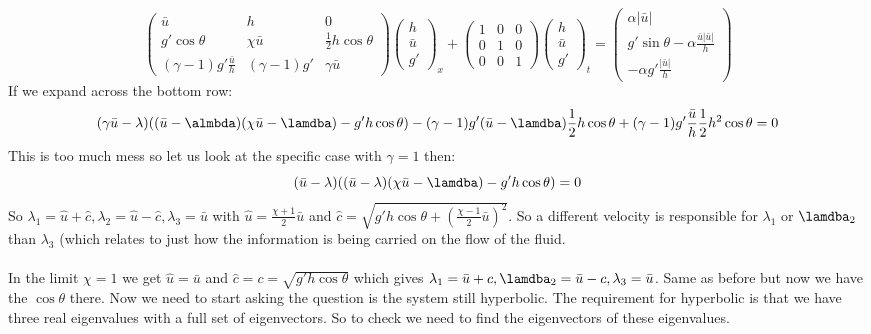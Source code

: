 \documentclass{article}
\begin{document}
$$
 \begin{pmatrix} \bar u & h & 0 \\ g' \cos \theta & \chi \bar u & \frac{1}{2} h \cos \theta \\ ( \gamma -1) g' \frac{\bar u}{h} & ( \gamma -1) g' & \gamma \bar u \end{pmatrix} \begin{pmatrix} h \\ \bar u \\ g' \end{pmatrix}_x + \begin{pmatrix} 1 & 0 & 0 \\ 0 & 1 & 0 \\ 0 & 0 & 1 \end{pmatrix} \begin{pmatrix} h \\ \bar u \\ g' \end{pmatrix}_t = \begin{pmatrix} \alpha | \bar u |\\ g' \sin \theta - \alpha \frac{\bar u | \bar u |}{h} \\ - \alpha g' \frac{| \bar u|}{h} \end{pmatrix}
$$
If we expand across the bottom row:
$$
 ( \gamma \bar u - \lambda) ( ( \bar u - \almbda) ( \chi \bar u - \lamdba) - g' h \cos \theta) - ( \gamma -1) g' ( \bar u - \lamdba) \frac{1}{2} h \cos \theta + ( \gamma -1) g' \frac{\bar u}{h} \frac{1}{2} h^2 \cos \theta = 0
$$
This is too much mess so let us look at the specific case with $\gamma =1$ then:
$$
( \bar u - \lambda) ( (\bar u - \lambda)( \chi \bar u - \lamdba) - g' h \cos \theta) = 0
$$
So $\lambda_1 = \hat u + \hat c, \lambda_2 = \hat u - \hat c, \lambda_3 = \bar u$ with $\hat u = \frac{\chi +1}{2} \bar u$ and $\hat c = \sqrt{ g' h \cos \theta + ( \frac{\chi -1}{2} \bar u)^2}$. So a different velocity is responsible for $\lambda_1$ or $\lamdba_2$ than $\lambda_3$ (which relates to just how the information is being carried on the flow of the fluid.\\\\
In the limit $\chi = 1$ we get $\hat u = \bar u$ and $\hat c = c = \sqrt{g' h \cos \theta}$ which gives $\lambda_1 = \bar u + c, \lamdba_2 = \bar u -c, \lambda_3 = \bar u$. Same as before but now we have the $\cos \theta$ there. Now we need to start asking the question is the system still hyperbolic. The requirement for hyperbolic is that we have three real eigenvalues with a full set of eigenvectors. So to check we need to find the eigenvectors of these eigenvalues.
\end{document}
